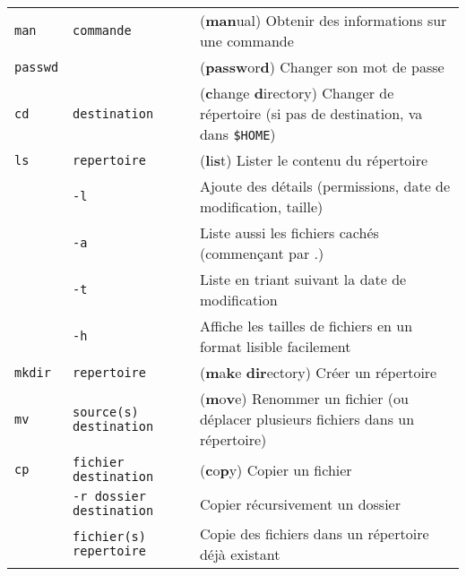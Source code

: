 \documentclass [a4paper]{article}
\begin{document}
\noindent
\begin{tabular}{ lll }
\hline
{\verb+man+}    & \verb+commande+              & (\textbf{man}ual) Obtenir des informations sur une commande \\
{\verb+passwd+} &                              & (\textbf{passw}or\textbf{d}) Changer son mot de passe \\
{\verb+cd+}     & \verb+destination+           & (\textbf{c}hange \textbf{d}irectory) Changer de répertoire (si pas de destination, va dans \verb+$HOME+)\\
{\verb+ls+}     & \verb+repertoire+            & (\textbf{l}i\textbf{s}t) Lister le contenu du répertoire \\
                & \hspace{-0.6cm}\verb+-l+                    & \hspace{0.4cm} Ajoute des détails (permissions, date de modification, taille)\\
                & \hspace{-0.6cm}\verb+-a+                    & \hspace{0.4cm} Liste aussi les fichiers cachés (commençant par .)\\
                & \hspace{-0.6cm}\verb+-t+                    & \hspace{0.4cm} Liste en triant suivant la date de modification\\
                & \hspace{-0.6cm}\verb+-h+                    & \hspace{0.4cm} Affiche les tailles de fichiers en un format lisible facilement\\
{\verb+mkdir+}  & \verb+repertoire+            & (\textbf{m}a\textbf{k}e \textbf{dir}ectory) Créer un répertoire \\
{\verb+mv+}     & \verb+source(s) destination+ & (\textbf{m}o\textbf{v}e) Renommer un fichier (ou déplacer plusieurs fichiers dans un répertoire) \\
{\verb+cp+}     & \verb+fichier destination+   & (\textbf{c}o\textbf{p}y) Copier un fichier\\
                & \hspace{-0.6cm}\verb+-r dossier destination+  & \hspace{0.4cm} Copier récursivement un dossier\\
                & \verb+fichier(s) repertoire+                  & \hspace{0.4cm} Copie des fichiers dans un répertoire déjà existant\\

\end{tabular}
\end{document}
